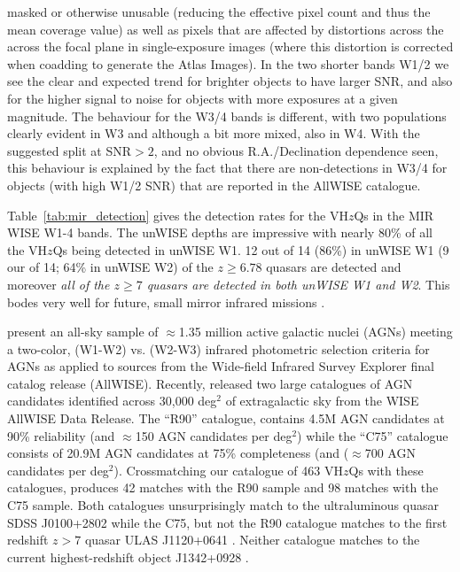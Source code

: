 \documentclass[usenatbib]{mnras}
\begin{document}
masked or otherwise unusable (reducing the effective pixel count and
thus the mean coverage value) as well as pixels that are affected by
distortions across the across the focal plane in single-exposure
images (where this distortion is corrected when coadding to generate
the Atlas Images). 
In the two shorter bands W1/2 we see the clear and expected
trend for brighter objects to have larger SNR, and also for the higher
signal to noise for objects with more exposures at a given
magnitude. The behaviour for the W3/4 bands is different, with two
populations clearly evident in W3 and although a bit more mixed, also
in W4. With the suggested split at SNR$>2$, and no obvious
R.A./Declination dependence seen, this behaviour is explained by the
fact that there are non-detections in W3/4 for objects (with high W1/2
SNR) that are reported in the AllWISE catalogue.

Table~\ref{tab:mir_detection} gives the detection rates for the
VH$z$Qs in the MIR WISE W1-4 bands. The unWISE depths are impressive
with nearly 80\% of all the VH$z$Qs being detected in unWISE W1. 12
out of 14 (86\%) in unWISE W1 (9 our of 14; 64\% in unWISE W2) of the
$z\geq6.78$ quasars are detected and moreover {\it all of the $z\geq7$
quasars are detected in both unWISE W1 and W2}. This bodes very well
for future, small mirror infrared missions \citep[e.g.][]{NEOCam_WP}.

\citet{Secrest2015} present an all-sky sample of $\approx$1.35 million active galactic nuclei (AGNs) 
meeting a two-color, (W1-W2) vs. (W2-W3) infrared photometric selection criteria for AGNs as applied to sources from the Wide-field Infrared Survey Explorer final catalog release (AllWISE). 
Recently, \citet{Assef2018} released two large catalogues of AGN
candidates identified across 30,000 deg$^2$ of extragalactic sky from
the WISE AllWISE Data Release. The ``R90'' catalogue, contains 4.5M
AGN candidates at 90\% reliability (and $\approx$150 AGN candidates
per deg$^2$) while the ``C75'' catalogue consists of 20.9M AGN
candidates at 75\% completeness (and ($\approx$700 AGN candidates per
deg$^2$). Crossmatching our catalogue of 463 VH$z$Qs with these
catalogues, produces 42 matches with the R90 sample and 98 matches
with the C75 sample. Both catalogues unsurprisingly match to the
ultraluminous quasar SDSS J0100+2802 \citep{Wu2015} while the C75, but
not the R90 catalogue matches to the first redshift $z>7$ quasar ULAS
J1120+0641 \citep{Mortlock2011}. Neither catalogue matches to the
current highest-redshift object J1342+0928 \citep{Banados2018}.
\end{document}
